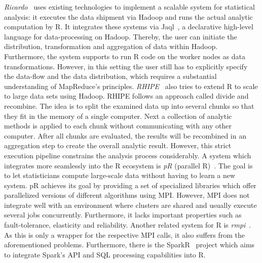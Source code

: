 {\em Ricardo}~\cite{das:2010a} uses existing technologies to implement a scalable system for statistical analysis: it executes the data shipment via Hadoop and runs the actual analytic computation by R. 
It integrates these systems via Jaql~\cite{beyer:2011a}, a declarative high-level language for data-processing on Hadoop. 
Thereby, the user can initiate the distribution, transformation and aggregation of data within Hadoop. 
Furthermore, the system supports to run R code on the worker nodes as data transformations. 
However, in this setting the user still has to explicitly specify the data-flow and the data distribution, which requires a substantial understanding of MapReduce's principles. 
{\em RHIPE}~\cite{guha:s2012a} also tries to extend R to scale to large data sets using Hadoop. 
RHIPE follows an approach called divide and recombine. 
The idea is to split the examined data up into several chunks so that they fit in the memory of a single computer. 
Next a collection of analytic methods is applied to each chunk without communicating with any other computer. 
After all chunks are evaluated, the results will be recombined in an aggregation step to create the overall analytic result. 
However, this strict execution pipeline constrains the analysis process considerably. 
A system which integrates more seamlessly into the R ecosystem is {\em pR} (parallel R)~\cite{samatova:2009a}. 
The goal is to let statisticians compute large-scale data without having to learn a new system. 
pR achieves its goal by providing a set of specialized libraries which offer parallelized versions of different algorithms using MPI.
However, MPI does not integrate well with an environment where clusters are shared and usually execute several jobs concurrently. 
Furthermore, it lacks important properties such as fault-tolerance, elasticity and reliability. 
Another related system for R is {\em rmpi}~\cite{rmpi}. 
As this is only a wrapper for the respective MPI calls, it also suffers from the aforementioned problems. 
Furthermore, there is the SparkR~\cite{Venkataraman2016} project which aims to integrate Spark's API and SQL processing capabilities into R. 

